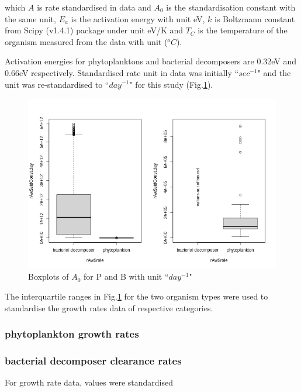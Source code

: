 \documentclass[../thesis.tex]{subfiles} %
\begin{document}
which $A$ is rate standardised in data and $A_0$ is the standardisation constant with the same unit, $E_a$ is the activation energy with unit eV, $k$ is Boltzmann constant from Scipy (v1.4.1) package under unit eV/K and $T_C$ is the temperature of the organism measured from the data with unit ($^oC$).

Activation energies for phytoplanktons and bacterial decomposers are 0.32eV and 0.66eV respectively.\autocite{regaudie2012temperature}  Standardised rate unit in data was initially ``$sec^{-1}$" and the unit was re-standardised to ``$day^{-1}$" for this study (Fig.\ref{growStdVal}).

\begin{figure}[H]
    \centering
    \includegraphics[width=.8\linewidth]{../result/stdCst.png}
    \caption[Boxplot of standardised $A_0$]{Boxplots of $A_0$ for P and B with unit ``$day^{-1}$"}
    \label{growStdVal}
\end{figure}

The interquartile ranges in Fig.\ref{growStdVal} for the two organism types were used to standardise the growth rates data of respective categories.

\subsubsection{phytoplankton growth rates}


\subsubsection{bacterial decomposer clearance rates}
For growth rate data, values were standardised
\end{document}
